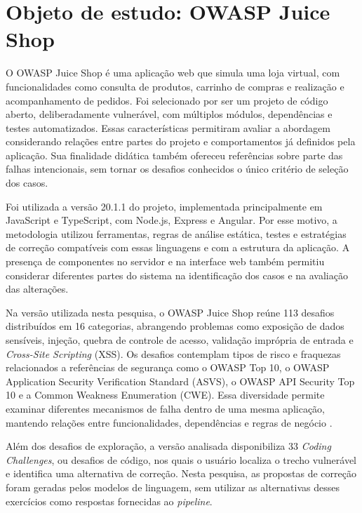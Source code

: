 \section{Objeto de estudo: OWASP Juice Shop}
\label{sec:met-objeto}

O OWASP Juice Shop é uma aplicação web que simula uma loja virtual, com funcionalidades como consulta de produtos, carrinho de compras e realização e acompanhamento de pedidos. Foi selecionado por ser um projeto de código aberto, deliberadamente vulnerável, com múltiplos módulos, dependências e testes automatizados. Essas características permitiram avaliar a abordagem considerando relações entre partes do projeto e comportamentos já definidos pela aplicação. Sua finalidade didática também ofereceu referências sobre parte das falhas intencionais, sem tornar os desafios conhecidos o único critério de seleção dos casos.

Foi utilizada a versão 20.1.1 do projeto, implementada principalmente em JavaScript e TypeScript, com Node.js, Express e Angular. Por esse motivo, a metodologia utilizou ferramentas, regras de análise estática, testes e estratégias de correção compatíveis com essas linguagens e com a estrutura da aplicação. A presença de componentes no servidor e na interface web também permitiu considerar diferentes partes do sistema na identificação dos casos e na avaliação das alterações.

Na versão utilizada nesta pesquisa, o OWASP Juice Shop reúne 113 desafios distribuídos em 16 categorias, abrangendo problemas como exposição de dados sensíveis, injeção, quebra de controle de acesso, validação imprópria de entrada e \textit{Cross-Site Scripting} (XSS). Os desafios contemplam tipos de risco e fraquezas relacionados a referências de segurança como o OWASP Top 10, o OWASP Application Security Verification Standard (ASVS), o OWASP API Security Top 10 e a Common Weakness Enumeration (CWE). Essa diversidade permite examinar diferentes mecanismos de falha dentro de uma mesma aplicação, mantendo relações entre funcionalidades, dependências e regras de negócio \cite{juice_shop}.

Além dos desafios de exploração, a versão analisada disponibiliza 33 \textit{Coding Challenges}, ou desafios de código, nos quais o usuário localiza o trecho vulnerável e identifica uma alternativa de correção. Nesta pesquisa, as propostas de correção foram geradas pelos modelos de linguagem, sem utilizar as alternativas desses exercícios como respostas fornecidas ao \textit{pipeline}.

